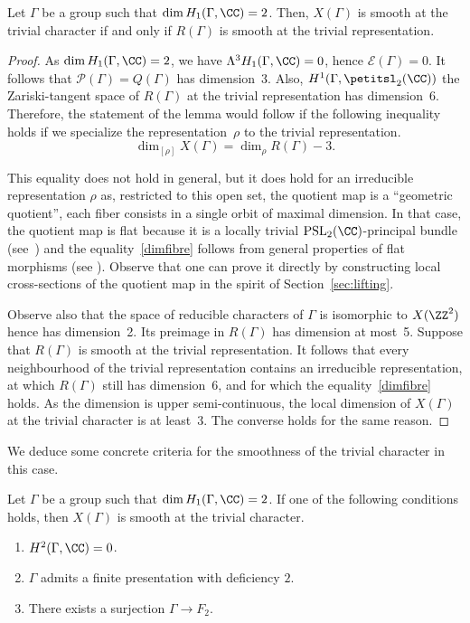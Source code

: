 \begin{lemma}\label{lem:Rsuffit}
Let $\Gamma$ be a group such that $\dim H_1(\Gamma,\CC)=2$.
Then, $X(\Gamma)$ is smooth at the trivial character if and only if
$R(\Gamma)$ is smooth at the trivial representation.
\end{lemma}
\begin{proof}
As $\dim H_1(\Gamma,\CC)=2$, we have
$\Lambda^3 H_1(\Gamma,\CC)=0$, hence $\mathcal{E}(\Gamma)=0$.
It follows that $\mathcal{P}(\Gamma)=Q(\Gamma)$ has dimension~3.
Also, $H^1(\Gamma,\petitsl_2(\CC))$ \ie the Zariski-tangent
space of $R(\Gamma)$ at the trivial representation has dimension~6.
Therefore, the statement of the lemma would follow if
the following inequality holds if we specialize the representation~$\rho$
to the trivial representation.
\begin{equation}\label{dimfibre}
\dim_{[\rho]} X(\Gamma) = \dim_\rho R(\Gamma)-3.
\end{equation}

This equality does not hold in general, but it does hold for an
irreducible representation $\rho$ as, restricted to this open set, the
quotient map is a ``geometric quotient'', \ie 
each fiber consists in a
single orbit of maximal dimension. In that case, the quotient map is flat
because it is a locally trivial $\mathrm{PSL}_2(\CC)$-principal bundle
(see~\cite[Prop.\,0.9]{GIT}) and the equality~\eqref{dimfibre}
follows from general properties of flat morphisms
(see \eg \cite[Th.\,3.12]{Liu}).
Observe that one can prove it directly
by constructing local cross-sections of the quotient map in the spirit of
Section~\ref{sec:lifting}.

Observe also that the space of reducible characters of $\Gamma$ is
isomorphic to $X(\ZZ^2)$ hence has dimension~2. Its preimage in $R(\Gamma)$
has dimension at most~5. Suppose that $R(\Gamma)$ is smooth at the trivial
representation. It follows that every neighbourhood of the trivial
representation contains an irreducible representation, at which $R(\Gamma)$
still has dimension~6, and for which the equality~\eqref{dimfibre} holds.
As the dimension is upper semi-continuous,
the local dimension of $X(\Gamma)$ at the trivial
character is at least~3. The converse holds for the same reason.
\end{proof}

We deduce some concrete criteria for the smoothness of the trivial
character in this case.

\begin{proposition}\label{criteres}
Let $\Gamma$ be a group such that $\dim H_1(\Gamma,\CC)=2$. If one of the
following conditions holds, then $X(\Gamma)$ is smooth at the trivial
character.
\begin{enumerate}
\item $H^2(\Gamma,\CC)=0$.
\item $\Gamma$ admits a finite presentation with deficiency $2$.
\item There exists a surjection $\Gamma\to F_2$.
\end{enumerate}
\end{proposition}

